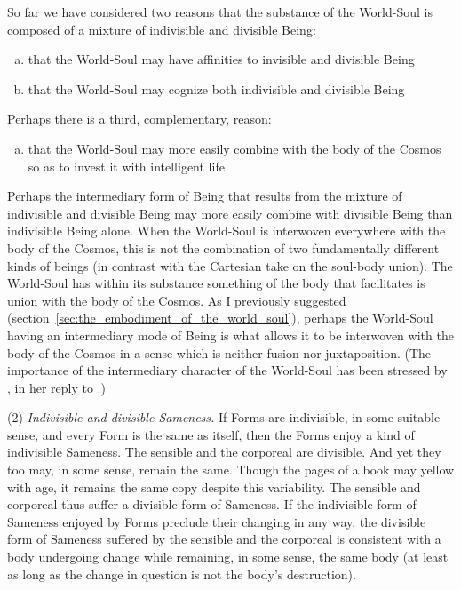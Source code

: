 So far we have considered two reasons that the substance of the World-Soul is composed of a mixture of indivisible and divisible Being:
\begin{enumerate}[(a)]
	\item that the World-Soul may have affinities to invisible and divisible Being
	\item that the World-Soul may cognize both indivisible and divisible Being
\end{enumerate}
Perhaps there is a third, complementary, reason:
\begin{enumerate}[(c)]
	\item that the World-Soul may more easily combine with the body of the Cosmos so as to invest it with intelligent life
\end{enumerate}
Perhaps the intermediary form of Being that results from the mixture of indivisible and divisible Being may more easily combine with divisible Being than indivisible Being alone. When the World-Soul is interwoven everywhere with the body of the Cosmos, this is not the combination of two fundamentally different kinds of beings (in contrast with the Cartesian take on the soul-body union). The World-Soul has within its substance something of the body that facilitates is union with the body of the Cosmos. As I previously suggested (section~\ref{sec:the_embodiment_of_the_world_soul}), perhaps the World-Soul having an intermediary mode of Being is what allows it to be interwoven with the body of the Cosmos in a sense which is neither fusion nor juxtaposition. (The importance of the intermediary character of the World-Soul has been stressed by \citealt[182--3]{Miller:1997up}, in her reply to \citealt{Brisson:1997qr}.)

(2) \emph{Indivisible and divisible Sameness.} If Forms are indivisible, in some suitable sense, and every Form is the same as itself, then the Forms enjoy a kind of indivisible Sameness. The sensible and the corporeal are divisible. And yet they too may, in some sense, remain the same. Though the pages of a book may yellow with age, it remains the same copy despite this variability. The sensible and corporeal thus suffer a divisible form of Sameness. If the indivisible form of Sameness enjoyed by Forms preclude their changing in any way, the divisible form of Sameness suffered by the sensible and the corporeal is consistent with a body undergoing change while remaining, in some sense, the same body (at least as long as the change in question is not the body's destruction).

